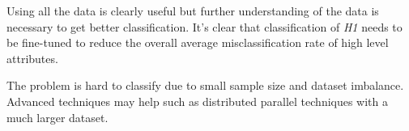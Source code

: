 \documentclass[11pt]{article}
\begin{document}
Using all the data is clearly useful but further understanding of the data is necessary to get better classification. It's clear that classification of \textit{H1} needs to be fine-tuned to reduce the overall average misclassification rate of high level attributes.

The problem is hard to classify due to small sample size and dataset imbalance. Advanced techniques may help such as distributed parallel techniques with a much larger dataset\cite{panda}.
\pagebreak



\end{document}
